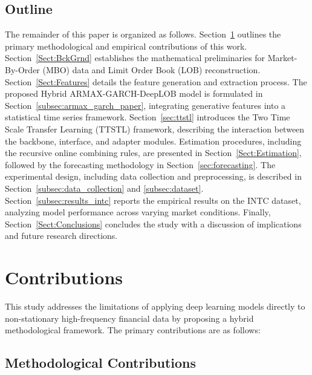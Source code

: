 \documentclass[10pt,a4paper,oneside]{article}
\begin{document}
\subsection{Outline}
\label{subsec:outline}

The remainder of this paper is organized as follows. Section~\ref{Sect:Contributions} outlines the primary methodological and empirical contributions of this work. Section~\ref{Sect:BckGrnd} establishes the mathematical preliminaries for Market-By-Order (MBO) data and Limit Order Book (LOB) reconstruction. Section~\ref{Sect:Features} details the feature generation and extraction process. The proposed Hybrid ARMAX-GARCH-DeepLOB model is formulated in Section~\ref{subsec:armax_garch_paper}, integrating generative features into a statistical time series framework. Section~\ref{sec:ttstl} introduces the Two Time Scale Transfer Learning (TTSTL) framework, describing the interaction between the backbone, interface, and adapter modules. Estimation procedures, including the recursive online combining rules, are presented in Section~\ref{Sect:Estimation}, followed by the forecasting methodology in Section~\ref{sec:forecasting}. The experimental design, including data collection and preprocessing, is described in Section~\ref{subsec:data_collection} and \ref{subsec:dataset}. Section~\ref{subsec:results_intc} reports the empirical results on the INTC dataset, analyzing model performance across varying market conditions. Finally, Section~\ref{Sect:Conclusions} concludes the study with a discussion of implications and future research directions.

\section{Contributions}
\label{Sect:Contributions}

This study addresses the limitations of applying deep learning models directly to non-stationary high-frequency financial data by proposing a hybrid methodological framework. The primary contributions are as follows:

\subsection{Methodological Contributions}
\end{document}
